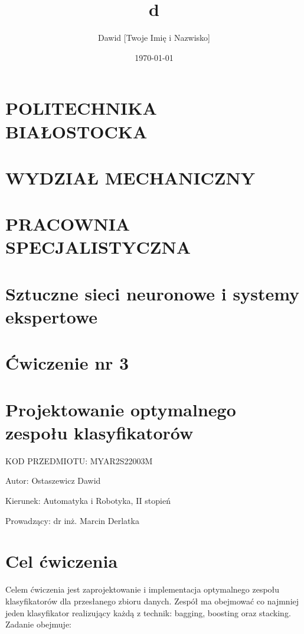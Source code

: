 \documentclass[polish,11pt,a4paper]{article}
\title{d}
\author{Dawid [Twoje Imię i Nazwisko]}
\date{\today}
\begin{document}
	

\centering
\section*{POLITECHNIKA BIAŁOSTOCKA}

\section*{WYDZIAŁ MECHANICZNY}
\section*{PRACOWNIA SPECJALISTYCZNA}
\section*{ Sztuczne sieci neuronowe i systemy ekspertowe}
\section*{Ćwiczenie nr 3 }
\section*{Projektowanie optymalnego zespołu klasyfikatorów}
\large
KOD PRZEDMIOTU: MYAR2S22003M
\break
\large
\break
\break
\break

\raggedright
Autor: Ostaszewicz Dawid
\break

Kierunek: Automatyka i Robotyka, II stopień

Prowadzący: dr inż. Marcin Derlatka
\clearpage
\justifying	
\section*{Cel ćwiczenia}

Celem ćwiczenia jest zaprojektowanie i implementacja optymalnego zespołu klasyfikatorów dla przesłanego zbioru danych. Zespół ma obejmować co najmniej jeden klasyfikator realizujący każdą z technik: bagging, boosting oraz stacking. Zadanie obejmuje:
\end{document}
